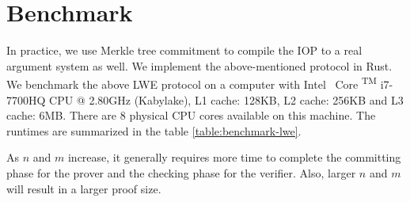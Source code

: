 \section{Benchmark}

In practice, we use Merkle tree commitment to compile the IOP to a real argument system as well. We implement the above-mentioned protocol in Rust. We benchmark the above LWE protocol on a computer with
Intel \textregistered \, Core  \textsuperscript{TM} i7-7700HQ CPU @ 2.80GHz (Kabylake), L1 cache: 128KB, L2 cache: 256KB and L3 cache: 6MB. There are 8 physical CPU cores available on this machine. The runtimes are summarized in the table \ref{table:benchmark-lwe}.


As $n$ and $m$ increase, it generally requires more time to complete
the committing phase for the prover and the checking phase for the verifier. Also, larger $n$ and $m$ will result in a larger proof size.




